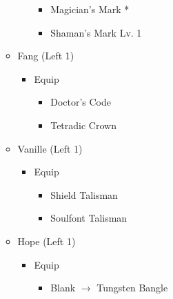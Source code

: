 \documentclass{report}
\begin{document}
\begin{menu}
\begin{itemize}
\begin{itemize}
\begin{itemize}
            \begin{itemize}
                \item Magician's Mark *
                \item Shaman's Mark Lv. 1
            \end{itemize}
        \end{itemize}
        \item Fang (Left 1)
        \begin{itemize}
            \item Equip
            \begin{itemize}
                \item Doctor's Code
                \item Tetradic Crown
            \end{itemize}
        \end{itemize}
        \item Vanille (Left 1)
        \begin{itemize}
            \item Equip
            \begin{itemize}
                \item Shield Talisman
                \item Soulfont Talisman
            \end{itemize}
        \end{itemize}
        \item Hope (Left 1)
        \begin{itemize}
            \item Equip
            \begin{itemize}
                \item Blank $\rightarrow$ Tungsten Bangle
            \end{itemize}
        \end{itemize}
    \end{itemize}
\end{itemize}
\end{menu}

\end{document}
